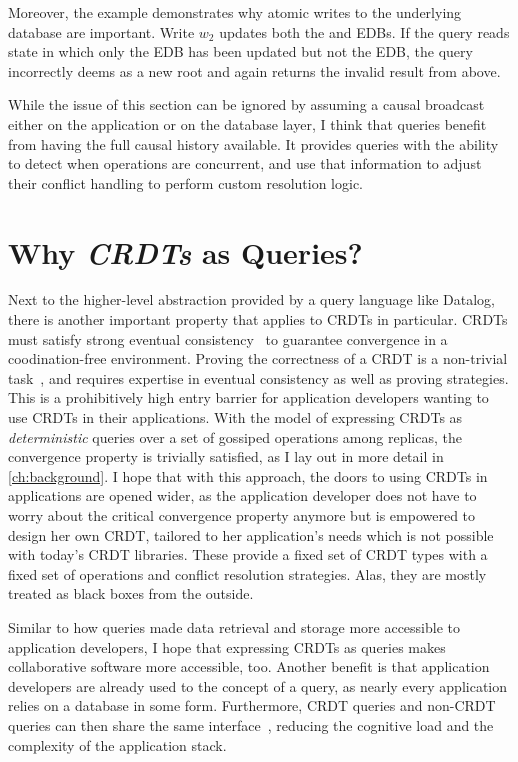 Moreover, the example demonstrates why atomic writes to the underlying database
are important.
Write \(w_2\) updates both the  and  EDBs.
If the query reads state in which only the  EDB has been updated
but not the  EDB,
the query incorrectly deems  as a new root and
again returns the invalid result from above.

While the issue of this section can be ignored by assuming a causal broadcast
either on the application or on the database layer,
I think that queries benefit from having the full causal history available.
It provides queries with the ability to detect when operations are concurrent,
and use that information to adjust their conflict handling to perform
custom resolution logic.

\section{Why \emph{\acp{CRDT}} as Queries?}

Next to the higher-level abstraction provided by a query language like Datalog,
there is another important property that applies to \acp{CRDT} in particular.
\acp{CRDT} must satisfy strong eventual consistency~\cite{shapiro2011comprehensive}
to guarantee convergence in a coodination-free environment.
Proving the correctness of a \ac{CRDT} is a non-trivial
task~\cite{gomes2017verifying, kleppmann2022assessing},
and requires expertise in eventual consistency as well as proving strategies.
This is a prohibitively high entry barrier for application developers
wanting to use \acp{CRDT} in their applications.
With the model of expressing \acp{CRDT} as \emph{deterministic} queries over a
set of gossiped operations among replicas, the convergence property is trivially
satisfied, as I lay out in more detail in \autoref{ch:background}.
I hope that with this approach, the doors to using \acp{CRDT} in applications
are opened wider, as the application developer does not have to worry about
the critical convergence property anymore but is empowered to design her own
\ac{CRDT}, tailored to her application's needs which is not possible with
today's \ac{CRDT} libraries.
These provide a fixed set of \ac{CRDT} types with a fixed set of operations
and conflict resolution strategies.
Alas, they are mostly treated as black boxes from the outside.

Similar to how queries made data retrieval and storage more accessible to
application developers, I hope that expressing \acp{CRDT} as queries
makes collaborative software more accessible, too.
Another benefit is that application developers are already used to the concept
of a query, as nearly every application relies on a database in some form.
Furthermore, \ac{CRDT} queries and non-\ac{CRDT} queries can then share the
same interface~\cite{litt2023riffle}, reducing the cognitive load and the
complexity of the application stack.

